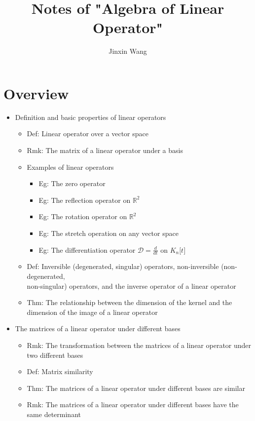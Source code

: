 \documentclass[onecolumn]{ctexart}
\title{Notes of "Algebra of Linear Operator"}
\author{Jinxin Wang}
\date{}
\begin{document}
\maketitle

\section{Overview}
\begin{itemize}
  \item Definition and basic properties of linear operators
  \begin{itemize}
    \item Def: Linear operator over a vector space
    \item Rmk: The matrix of a linear operator under a basis
    \item Examples of linear operators
    \begin{itemize}
      \item Eg: The zero operator
      \item Eg: The reflection operator on $\mathbb{R}^2$
      \item Eg: The rotation operator on $\mathbb{R}^2$
      \item Eg: The stretch operation on any vector space
      \item Eg: The differentiation operator $\mathcal{D} = \frac{d}{dt}$ on $K_n\lbrack t \rbrack$
    \end{itemize}
    \item Def: Inversible (degenerated, singular) operators, non-inversible (non-degenerated, \\ non-singular) operators, and the inverse operator of a linear operator
    \item Thm: The relationship between the dimension of the kernel and the dimension of the image of a linear operator
  \end{itemize}
  \item The matrices of a linear operator under different bases
  \begin{itemize}
    \item Rmk: The transformation between the matrices of a linear operator under two different bases
    \item Def: Matrix similarity
    \item Thm: The matrices of a linear operator under different bases are similar
    \item Rmk: The matrices of a linear operator under different bases have the same determinant

\end{itemize}
\end{itemize}
\end{document}
